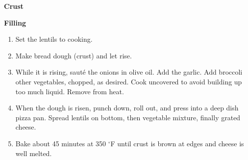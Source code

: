 
\bigskip
\textbf{Crust}

\begin{ingredients}
\end{ingredients}


\bigskip
\textbf{Filling}

\begin{ingredients}
\end{ingredients}


\begin{recipe}
  \begin{enumerate}

  \item Set the lentils to cooking.

  \item Make bread dough (crust) and let rise.

  \item While it is rising, saut\'e the onions in olive oil.  Add the
    garlic.  Add broccoli other vegetables, chopped, as desired.  Cook
    uncovered to avoid building up too much liquid.
    Remove from heat.

  \item When the dough is risen, punch down, roll out, and press into
    a deep dish pizza pan.  Spread lentils on bottom, then vegetable
    mixture, finally grated cheese.

  \item Bake about 45 minutes at 350 $^\circ$F until crust is brown at
    edges and cheese is well melted.

  \end{enumerate}
\end{recipe}

